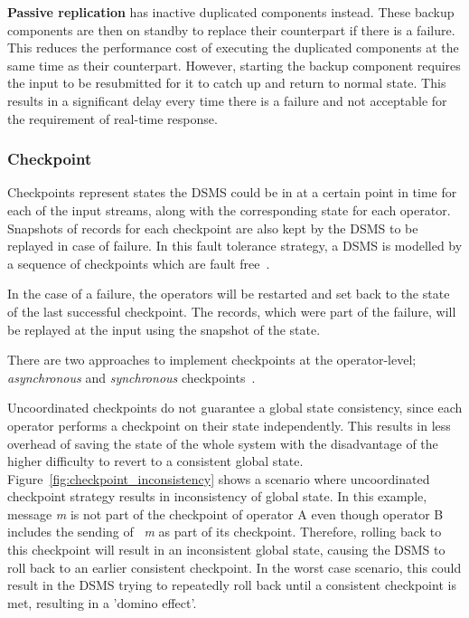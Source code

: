 \textbf{Passive replication} has inactive duplicated components instead. These backup
components are then on standby to replace their counterpart if there is a failure. This 
reduces the performance cost of executing the duplicated components at the same 
time as their counterpart. However, starting the backup component requires the input 
to be resubmitted for it to catch up and return to normal state. This results in a significant 
delay every time there is a failure and not acceptable for the requirement of real-time response. 


\subsubsection{Checkpoint}

Checkpoints represent states the DSMS could be in at a certain point in 
time for each of the input streams, along with the corresponding 
state for each operator. Snapshots of records for each checkpoint are also kept 
by the DSMS to be replayed in case of failure. 
In this fault tolerance strategy, a DSMS is modelled by a sequence of 
checkpoints which are fault free~\cite{fault_tolerance_dsms}. 

In the case of a failure, the operators will be restarted and set back to the state of the 
last successful checkpoint. The records, which were part of the failure, will be replayed
at the input using the snapshot of the state. 

There are two approaches to implement checkpoints at the operator-level; 
\emph{asynchronous} and \emph{synchronous} checkpoints~\cite{fault_tolerance_dsms}.

Uncoordinated checkpoints do not guarantee a global state consistency, since 
each operator performs a checkpoint on their state independently. This results 
in less overhead of saving the state of the whole system with the disadvantage of the higher 
difficulty to revert to a consistent global state.
Figure~\ref{fig:checkpoint_inconsistency}
shows a scenario where uncoordinated checkpoint strategy results in inconsistency of 
global state. In this example, message \emph{m} is not part of the checkpoint of operator 
A even though operator B includes the sending of ~\emph{m} as part of its checkpoint. Therefore, 
rolling back to this checkpoint will result in an inconsistent global state, causing the 
DSMS to roll back to an earlier consistent checkpoint. In the worst case scenario, this could result 
in the DSMS trying to repeatedly roll back until a consistent checkpoint is met, 
resulting in a 'domino effect'.  

